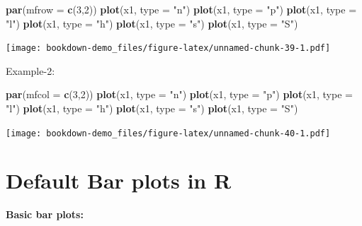 \documentclass[]{book}
\newenvironment{Shaded}{\begin{snugshade}}{\end{snugshade}}
\newcommand{\KeywordTok}[1]{\textcolor[rgb]{0.13,0.29,0.53}{\textbf{#1}}}
\newcommand{\DataTypeTok}[1]{\textcolor[rgb]{0.13,0.29,0.53}{#1}}
\newcommand{\DecValTok}[1]{\textcolor[rgb]{0.00,0.00,0.81}{#1}}
\newcommand{\StringTok}[1]{\textcolor[rgb]{0.31,0.60,0.02}{#1}}
\newcommand{\NormalTok}[1]{#1}
\begin{document}
\begin{Shaded}
\begin{Highlighting}[]
\KeywordTok{par}\NormalTok{(}\DataTypeTok{mfrow =} \KeywordTok{c}\NormalTok{(}\DecValTok{3}\NormalTok{,}\DecValTok{2}\NormalTok{))}
\KeywordTok{plot}\NormalTok{(x1, }\DataTypeTok{type =} \StringTok{"n"}\NormalTok{)}
\KeywordTok{plot}\NormalTok{(x1, }\DataTypeTok{type =} \StringTok{"p"}\NormalTok{)}
\KeywordTok{plot}\NormalTok{(x1, }\DataTypeTok{type =} \StringTok{"l"}\NormalTok{)}
\KeywordTok{plot}\NormalTok{(x1, }\DataTypeTok{type =} \StringTok{"h"}\NormalTok{)}
\KeywordTok{plot}\NormalTok{(x1, }\DataTypeTok{type =} \StringTok{"s"}\NormalTok{)}
\KeywordTok{plot}\NormalTok{(x1, }\DataTypeTok{type =} \StringTok{"S"}\NormalTok{)}
\end{Highlighting}
\end{Shaded}

\texttt{[image: bookdown-demo\_files/figure-latex/unnamed-chunk-39-1.pdf]}

Example-2:

\begin{Shaded}
\begin{Highlighting}[]
\KeywordTok{par}\NormalTok{(}\DataTypeTok{mfcol =} \KeywordTok{c}\NormalTok{(}\DecValTok{3}\NormalTok{,}\DecValTok{2}\NormalTok{))}
\KeywordTok{plot}\NormalTok{(x1, }\DataTypeTok{type =} \StringTok{"n"}\NormalTok{)}
\KeywordTok{plot}\NormalTok{(x1, }\DataTypeTok{type =} \StringTok{"p"}\NormalTok{)}
\KeywordTok{plot}\NormalTok{(x1, }\DataTypeTok{type =} \StringTok{"l"}\NormalTok{)}
\KeywordTok{plot}\NormalTok{(x1, }\DataTypeTok{type =} \StringTok{"h"}\NormalTok{)}
\KeywordTok{plot}\NormalTok{(x1, }\DataTypeTok{type =} \StringTok{"s"}\NormalTok{)}
\KeywordTok{plot}\NormalTok{(x1, }\DataTypeTok{type =} \StringTok{"S"}\NormalTok{)}
\end{Highlighting}
\end{Shaded}

\texttt{[image: bookdown-demo\_files/figure-latex/unnamed-chunk-40-1.pdf]}

\chapter{Default Bar plots in R}\label{default-bar-plots-in-r}

\textbf{Basic bar plots:}
\end{document}
